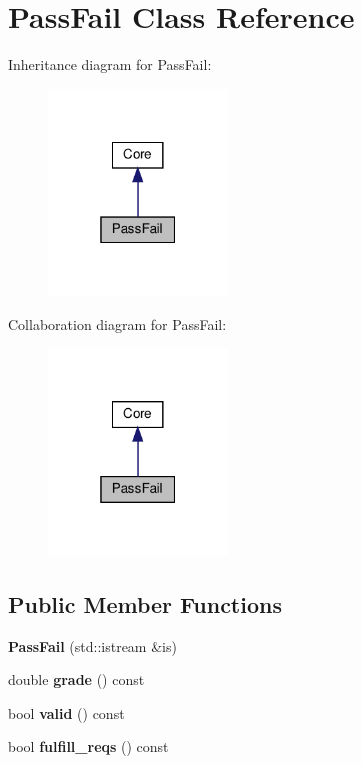 \hypertarget{classPassFail}{}\section{Pass\+Fail Class Reference}
\label{classPassFail}


Inheritance diagram for Pass\+Fail\+:\nopagebreak
\begin{figure}[H]
\begin{center}
\leavevmode
\includegraphics[width=135pt]{classPassFail__inherit__graph}
\end{center}
\end{figure}


Collaboration diagram for Pass\+Fail\+:\nopagebreak
\begin{figure}[H]
\begin{center}
\leavevmode
\includegraphics[width=135pt]{classPassFail__coll__graph}
\end{center}
\end{figure}
\subsection*{Public Member Functions}
\begin{DoxyCompactItemize}
\item 
\mbox{\label{classPassFail_a5c90795505aa60da716935c450919b77}} 
{\bfseries Pass\+Fail} (std\+::istream \&is)
\item 
\mbox{\label{classPassFail_a7f96a2d51a1a72c131ee93aa53bd5848}} 
double {\bfseries grade} () const
\item 
\mbox{\label{classPassFail_a06c77d7cd3c48f95476c17c53a6d7e7c}} 
bool {\bfseries valid} () const
\item 
\mbox{\label{classPassFail_a46d15c8f5f28b4c7b8f1311745c9a2a5}} 
bool {\bfseries fulfill\+\_\+reqs} () const
\end{DoxyCompactItemize}
